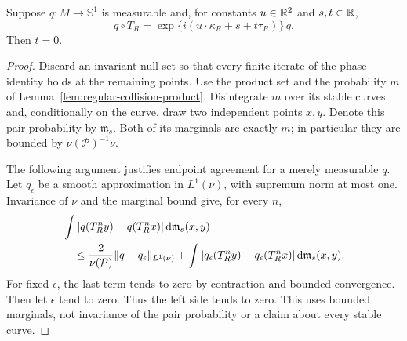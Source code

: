 \begin{proposition}
\label{prop:measurable-roof-rigidity}
Suppose $q:M\to\mathbb S^1$ is measurable and, for constants
$u\in\mathbb R^2$ and $s,t\in\mathbb R$,
\begin{equation}\label{eq:physical-measurable-phase}
 q\circ T_R=\exp\{i(u\cdot\kappa_R+s+t\tau_R)\}\,q.
\end{equation}
Then $t=0$.
\end{proposition}
\begin{proof}
Discard an invariant null set so that every finite iterate of the phase
identity holds at the remaining points. Use the product set and the
probability $m$ of Lemma~\ref{lem:regular-collision-product}.
Disintegrate $m$ over its stable curves and, conditionally on the curve,
draw two independent points $x,y$. Denote this pair probability by
$\mathfrak m_s$. Both of its marginals are exactly $m$; in particular
they are bounded by $\nu(\mathcal P)^{-1}\nu$.

The following argument justifies endpoint agreement for a merely
measurable $q$. Let $q_\epsilon$ be a smooth approximation in $L^1(\nu)$,
with supremum norm at most one. Invariance of $\nu$ and the marginal
bound give, for every $n$,
\begin{align}\label{eq:conditional-pair-approximation}
 &\int |q(T_R^ny)-q(T_R^nx)|\,\mathrm d\mathfrak m_s(x,y)\notag\\
 &\quad\le \frac{2}{\nu(\mathcal P)}\|q-q_\epsilon\|_{L^1(\nu)}
       +\int|q_\epsilon(T_R^ny)-q_\epsilon(T_R^nx)|\,\mathrm d\mathfrak m_s(x,y).
\end{align}
For fixed $\epsilon$, the last term tends to zero by contraction and
bounded convergence. Then let $\epsilon$ tend to zero. Thus the left
side tends to zero. This uses bounded marginals, not invariance of the
pair probability or a claim about every stable curve.


\end{proof}
